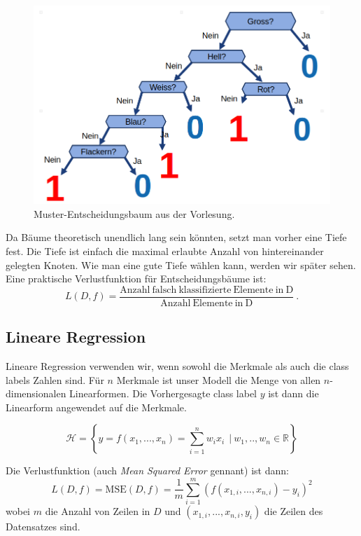 \begin{figure}[h]
    \centering
    \includegraphics[scale=0.4]{Figures/ML-Baum.png}
    \caption{Muster-Entscheidungsbaum aus der Vorlesung.}
    \label{fig:ml-baum}
\end{figure}

Da Bäume theoretisch unendlich lang sein könnten, setzt man vorher eine Tiefe fest. Die Tiefe ist einfach die maximal erlaubte Anzahl von hintereinander gelegten Knoten. Wie man eine gute Tiefe wählen kann, werden wir später sehen.\\

Eine praktische Verlustfunktion für Entscheidungsbäume ist:
\begin{equation}
    L(D,f) = \frac{\mathrm{Anzahl ~falsch ~klassifizierte ~Elemente ~in ~D}}{\mathrm{Anzahl ~Elemente ~in ~D}}~.
\end{equation}
\subsection{Lineare Regression}
Lineare Regression verwenden wir, wenn sowohl die Merkmale als auch die class labels  Zahlen sind. 
Für $n$ Merkmale ist unser Modell die Menge von allen $n$-dimensionalen Linearformen. 
Die Vorhergesagte class label $y$ ist dann die Linearform angewendet auf die Merkmale.

\begin{equation}
    \mathcal{H} = \left\{ y=f(x_1,...,x_n) = \sum_{i=1}^n w_ix_i ~~|~w_1,..,w_n \in \mathbb{R}\right\}
\end{equation}

Die Verlustfunktion (auch \textit{Mean Squared Error} gennant) ist dann:
\begin{equation}
    L(D, f) = \mathrm{MSE}(D,f) = \frac{1}{m} \sum_{i=1}^m (f(x_{1,i},...,x_{n,i}) - y_i)^2
\end{equation}
wobei $m$ die Anzahl von Zeilen in $D$ und $(x_{1,i},...,x_{n,i},y_i)$ die Zeilen des Datensatzes sind.\\

